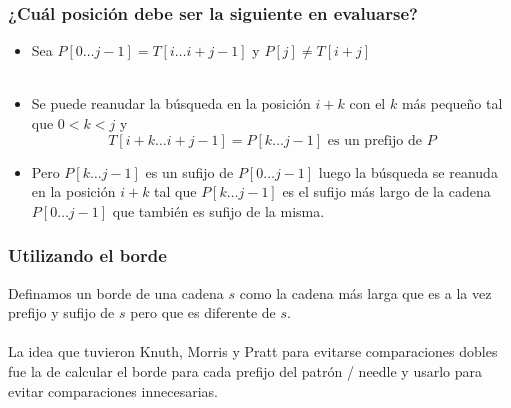\documentclass{beamer}
\begin{document}
	\begin{frame}
		\frametitle{¿Cuál posición debe ser la siguiente en evaluarse?}
		\begin{itemize}
			\item Sea $P[0 \ldots j-1] = T[i \ldots i+j-1]$ \quad y \quad $P[j] \neq T[i+j]$\\ \quad \\
			\item Se puede reanudar la búsqueda en la posición $i+k$ con el $k$ más pequeño tal que $0 < k < j$ y
					$$T[i+k \ldots i+j-1] = P[k \ldots j-1] \text{ es un prefijo de } P$$
			\item Pero $P[k \ldots j-1]$ es un sufijo de $P[0 \ldots j-1]$ luego la búsqueda se reanuda en la posición $i+k$ tal que $P[k \ldots j-1]$ es el sufijo más largo de la cadena $P[0 \ldots j-1]$ que también es sufijo de la misma.
		\end{itemize}
	\end{frame}
	
	\begin{frame}
		\frametitle{Utilizando el borde}
		Definamos un borde de una cadena $s$ como la cadena más larga que es a la vez prefijo y sufijo de $s$ pero que es diferente de $s$.\\ \quad \\
		La idea que tuvieron Knuth, Morris y Pratt para evitarse comparaciones dobles fue la de calcular el borde para cada prefijo del patrón / needle y usarlo para evitar comparaciones innecesarias.
	\end{frame}
	
\end{document}

